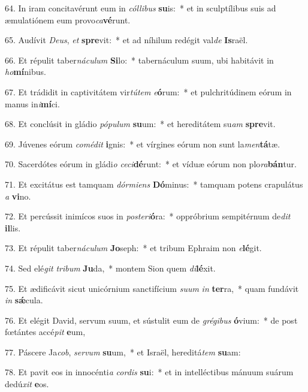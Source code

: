 64. In iram concitavérunt eum in \textit{cól}\textit{li}\textit{bus} \textbf{su}is:~*  et in sculptílibus suis ad æmulatiónem eum provo\textit{ca}\textbf{vé}runt.\

65. Audívit \textit{De}\textit{us}, \textit{et} \textbf{spre}vit:~*  et ad níhilum redégit val\textit{de} \textbf{Is}raël.\

66. Et répulit taber\textit{ná}\textit{cu}\textit{lum} \textbf{Si}lo:~*  tabernáculum suum, ubi habitávit in \textit{ho}\textbf{mí}nibus.\

67. Et trádidit in captivitátem vir\textit{tú}\textit{tem} \textit{e}\textbf{ó}rum:~*  et pulchritúdinem eórum in manus in\textit{i}\textbf{mí}ci.\

68. Et conclúsit in gládio \textit{pó}\textit{pu}\textit{lum} \textbf{su}um:~*  et hereditátem su\textit{am} \textbf{spre}vit.\

69. Júvenes eórum \textit{com}\textit{é}\textit{dit} \textbf{i}gnis:~*  et vírgines eórum non sunt la\textit{men}\textbf{tá}tæ.\

70. Sacerdótes eórum in gládi\textit{o} \textit{ce}\textit{ci}\textbf{dé}runt:~*  et víduæ eórum non plo\textit{ra}\textbf{bán}tur.\

71. Et excitátus est tamquam \textit{dór}\textit{mi}\textit{ens} \textbf{Dó}minus:~*  tamquam potens crapulátus \textit{a} \textbf{vi}no.\

72. Et percússit inimícos suos in \textit{post}\textit{e}\textit{ri}\textbf{ó}ra:~*  oppróbrium sempitérnum de\textit{dit} \textbf{il}lis.\

73. Et répulit taber\textit{ná}\textit{cu}\textit{lum} \textbf{Jo}seph:~*  et tribum Ephraim non \textit{e}\textbf{lé}git.\

74. Sed elé\textit{git} \textit{tri}\textit{bum} \textbf{Ju}da,~*  montem Sion quem \textit{di}\textbf{lé}xit.\

75. Et ædificávit sicut unicórnium sanctifícium \textit{su}\textit{um} \textit{in} \textbf{ter}ra,~*  quam fundávit \textit{in} \textbf{sǽ}cula.\

76. Et elégit David, servum suum, et sústulit eum de \textit{gré}\textit{gi}\textit{bus} \textbf{ó}vium:~*  de post fœtántes accé\textit{pit} \textbf{e}um,\

77. Páscere Ja\textit{cob}, \textit{ser}\textit{vum} \textbf{su}um,~*  et Israël, hereditá\textit{tem} \textbf{su}am:\

78. Et pavit eos in innocénti\textit{a} \textit{cor}\textit{dis} \textbf{su}i:~*  et in intelléctibus mánuum suárum dedú\textit{xit} \textbf{e}os.\

